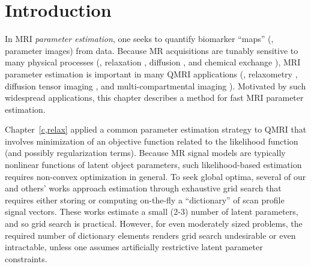 
\section{Introduction}
\label{s,krr,intro}

In MRI \emph{parameter estimation},
one seeks to quantify biomarker ``maps''
(\ie, parameter images) 
from data.
Because MR acquisitions 
are tunably sensitive
to many physical processes
(\eg, relaxation \cite{bloch:1946:ni-paper}, 
diffusion \cite{torrey:56:bew}, 
and chemical exchange \cite{mcconnell:58:rrb}),
MRI parameter estimation is important
in many QMRI applications
(\eg, relaxometry \cite{bloembergen:1948:rei}, 
diffusion tensor imaging \cite{bihan:01:dti}, 
and multi-compartmental imaging \cite{mackay:94:ivv}). 
Motivated by such widespread applications,
this chapter describes a method
for fast MRI parameter estimation.

Chapter~\ref{c,relax} applied
a common parameter estimation strategy
to QMRI
that involves minimization
of an objective function
related to the likelihood function
(and possibly regularization terms).
Because MR signal models are typically nonlinear functions
of latent object parameters,
such likelihood-based estimation
requires non-convex optimization in general.
To seek global optima,
several of our 
\cite{nataraj:14:rje,nataraj:14:mbe,nataraj::oms}
and others' 
\cite{staroswiecki:12:seo,ma:13:mrf,beneliezer:15:raa,zhao:16:mlr}
works approach estimation 
through exhaustive grid search
that requires either storing
or computing on-the-fly a ``dictionary'' 
of scan profile signal vectors.
These works estimate a small (2-3)
number of latent parameters,
and so grid search is practical.
However, 
for even moderately sized problems,
the required number 
of dictionary elements
renders grid search undesirable or even intractable,
unless one assumes artificially restrictive latent parameter constraints.

